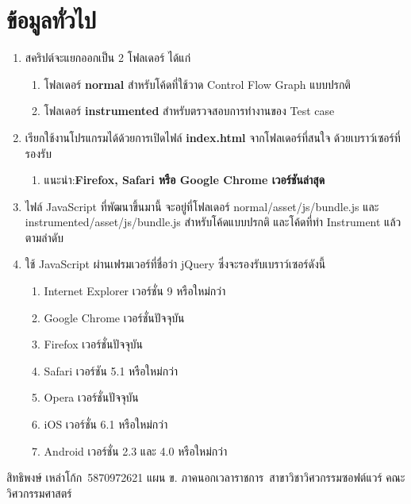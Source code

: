 \documentclass[12pt,a4paper]{article}
\newcommand{\sitdhibong}{สิทธิพงษ์ เหล่าโก้ก}
\newcommand{\studentid}{5870972621}
\newcommand{\department}{สาขาวิชาวิศวกรรมซอฟต์แวร์}
\newcommand{\faculty}{คณะวิศวกรรมศาสตร์}
\newcommand{\myprogram}{แผน ข. ภาคนอกเวลาราชการ}
\begin{document}
    \section{ข้อมูลทั่วไป}
    \begin{enumerate}
        \item สคริปต์จะแยกออกเป็น 2 โฟลเดอร์ ได้แก่
            \begin{enumerate}
                \item โฟลเดอร์ {\bf normal} สำหรับโค้ดที่ใช้วาด Control Flow Graph แบบปรกติ
                \item โฟลเดอร์ {\bf instrumented} สำหรับตรวจสอบการทำงานของ Test case
            \end{enumerate}
        \item เรียกใช้งานโปรแกรมได้ด้วยการเปิดไฟล์ {\bf index.html} จากโฟลเดอร์ที่สนใจ ด้วยเบราว์เซอร์ที่รองรับ
            \begin{enumerate}
                \item แนะนำ:{\bf Firefox, Safari หรือ Google Chrome เวอร์ชันล่าสุด}
            \end{enumerate}
        \item ไฟล์ JavaScript ที่พัฒนาขึ้นมานี้ จะอยู่ที่โฟลเดอร์ normal/asset/js/bundle.js และ instrumented/asset/js/bundle.js สำหรับโค้ดแบบปรกติ และโค้ดที่ทำ Instrument แล้ว ตามลำดับ
        \item ใช้ JavaScript ผ่านเฟรมเวอร์ที่ชื่อว่า jQuery ซึ่งจะรองรับเบราว์เซอร์ดังนี้
            \begin{enumerate}
                \item Internet Explorer เวอร์ชั่น 9 หรือใหม่กว่า
                \item Google Chrome เวอร์ชั่นปัจจุบัน
                \item Firefox เวอร์ชั่นปัจจุบัน
                \item Safari เวอร์ชัน 5.1 หรือใหม่กว่า 
                \item Opera เวอร์ชั่นปัจจุบัน 
                \item iOS เวอร์ชั่น 6.1 หรือใหม่กว่า
                \item Android เวอร์ชั่น 2.3 และ 4.0 หรือใหม่กว่า
            \end{enumerate}
    \end{enumerate}

    \sitdhibong\, \studentid \newline 
    \myprogram\, \department \hfill\break
    \faculty
\end{document}
